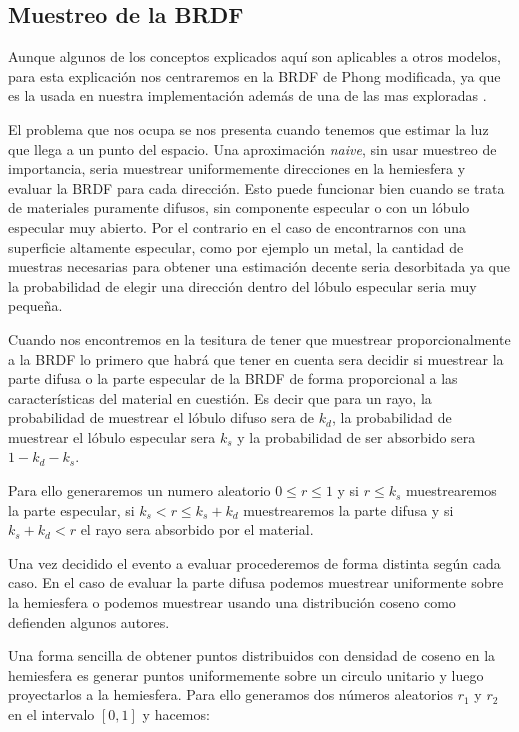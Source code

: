 \subsection{Muestreo de la BRDF}

Aunque algunos de los conceptos explicados aquí son aplicables a otros modelos, para esta explicación nos centraremos en la BRDF de Phong modificada, ya que es la usada en nuestra implementación además de una de las mas exploradas \cite{Lafortune1994}.

\medskip

El problema que nos ocupa se nos presenta cuando tenemos que estimar la luz que llega a un punto del espacio. Una aproximación \emph{naive}, sin usar muestreo de importancia, seria muestrear uniformemente direcciones en la hemiesfera y evaluar la BRDF para cada dirección. Esto puede funcionar bien cuando se trata de materiales puramente difusos, sin componente especular o con un lóbulo especular muy abierto. Por el contrario en el caso de encontrarnos con una superficie altamente especular, como por ejemplo un metal, la cantidad de muestras necesarias para obtener una estimación decente seria desorbitada ya que la probabilidad de elegir una dirección dentro del lóbulo especular seria muy pequeña.

\medskip
Cuando nos encontremos en la tesitura de tener que muestrear proporcionalmente a la BRDF lo primero que habrá que tener en cuenta sera decidir si muestrear la parte difusa o la parte especular de la BRDF de forma proporcional a las características del material en cuestión. Es decir que para un rayo, la probabilidad de muestrear el lóbulo difuso sera de $k_d$, la probabilidad de muestrear el lóbulo especular sera $k_s$ y la probabilidad de ser absorbido sera $1 - k_d - k_s$.

\medskip

Para ello generaremos un numero aleatorio $0 \leq r \leq 1$ y si
$r \leq k_s$ muestrearemos la parte especular,
si $k_s < r \leq k_s + k_d$ muestrearemos la parte difusa
y si $k_s + k_d < r$ el rayo sera absorbido por el material.

\medskip

Una vez decidido el evento a evaluar procederemos de forma distinta según cada caso. En el caso de evaluar la parte difusa podemos muestrear uniformente sobre la hemiesfera o podemos muestrear usando una distribución coseno como defienden algunos autores.

\clearpage

Una forma sencilla de obtener puntos distribuidos con densidad de coseno en la hemiesfera es generar puntos uniformemente sobre un circulo unitario y luego proyectarlos a la hemiesfera.
Para ello generamos dos números aleatorios $r_1$ y $r_2$ en el intervalo $[0, 1]$ y hacemos:

